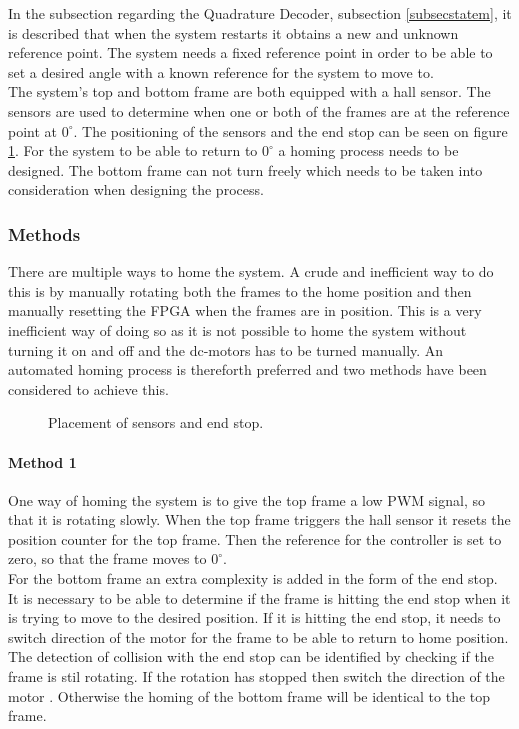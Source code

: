\documentclass[../../../main]{subfiles}
\begin{document}
In the subsection regarding the Quadrature Decoder, subsection \ref{subsecstatem},  it is described that when the system restarts it obtains a new and unknown reference point.
The system needs a fixed reference point in order to be able to set a desired angle with a known reference for the system to move to.  \\
The system's top and bottom frame are both equipped with a hall sensor.
The sensors are used to determine when one or both of the frames are at the reference point at $0^\circ$. The positioning of the sensors and the end stop can be seen on figure \ref{fig:homing_system}.
For the system to be able to return to $0^\circ$ a homing process needs to be designed.
The bottom frame can not turn freely which needs to be taken into consideration when designing the process.
\subsubsection{Methods} 
There are multiple ways to home the system. A crude and inefficient way to do this is by manually rotating both the frames to the home position and then manually resetting the FPGA when the frames are in position.
This is a very inefficient way of doing so as it is not possible to home the system without turning it on and off and the dc-motors has to be turned manually.
An automated homing process is thereforth preferred and two methods have been considered to achieve this.

\begin{figure}[H]
  \centering
  \def\svgwidth{\textwidth}
  
  \caption{Placement of sensors and end stop.}
  \label{fig:homing_system}
\end{figure}

\paragraph{Method 1}%
\label{par:method_1}
One way of homing the system is to give the top frame a low PWM signal, so that it is rotating slowly.
When the top frame triggers the hall sensor it resets the position counter for the top frame.
Then the reference for the controller is set to zero, so that the frame moves to $0^\circ$. 
\\
For the bottom frame an extra complexity is added in the form of the end stop. It is necessary to be able to determine if the frame is hitting the end stop when it is trying to move to the desired position.
If it is hitting the end stop, it needs to switch direction of the motor for the frame to be able to return to home position.
The detection of collision with the end stop can be identified by checking if the frame is stil rotating. If the rotation has stopped then switch the direction of the motor .
Otherwise the homing of the bottom frame will be identical to the top frame.
\end{document}
